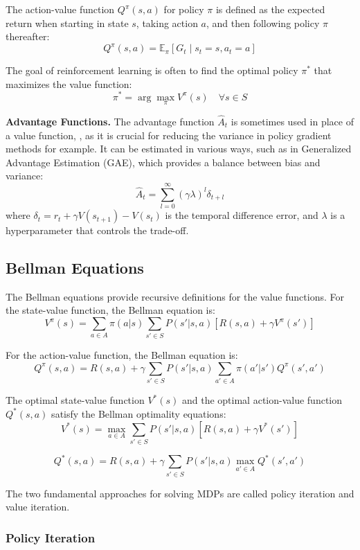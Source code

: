 The action-value function $Q^{\pi}(s, a)$ for policy $\pi$ is defined as the expected return when starting in state $s$, taking action $a$, and then following policy $\pi$ thereafter:
\[
Q^{\pi}(s, a) = \mathbb{E}_{\pi} \left[ G_t \mid s_t = s, a_t = a \right]
\]

The goal of reinforcement learning is often to find the optimal policy $\pi^*$ that maximizes the value function:
\[
\pi^* = \arg\max_{\pi} V^{\pi}(s) \quad \forall s \in S
\]

\textbf{Advantage Functions.} The advantage function $\hat{A}_t$ is sometimes used in place of a value function, , as it is crucial for reducing the variance in policy gradient methods for example.
It can be estimated in various ways, such as in Generalized Advantage Estimation (GAE), which provides a balance between bias and variance:
\[
\hat{A}_t = \sum_{l=0}^{\infty} (\gamma \lambda)^l \delta_{t+l}
\]
where $\delta_t = r_t + \gamma V(s_{t+1}) - V(s_t)$ is the temporal difference error, and $\lambda$ is a hyperparameter that controls the trade-off.

\subsection{Bellman Equations}

The Bellman equations provide recursive definitions for the value functions. For the state-value function, the Bellman equation is:
\[
V^{\pi}(s) = \sum_{a \in A} \pi(a|s) \sum_{s' \in S} P(s'|s,a) \left[ R(s,a) + \gamma V^{\pi}(s') \right]
\]

For the action-value function, the Bellman equation is:
\[
Q^{\pi}(s, a) = R(s,a) + \gamma \sum_{s' \in S} P(s'|s,a) \sum_{a' \in A} \pi(a'|s') Q^{\pi}(s', a')
\]

The optimal state-value function $V^*(s)$ and the optimal action-value function $Q^*(s, a)$ satisfy the Bellman optimality equations:
\[
V^*(s) = \max_{a \in A} \sum_{s' \in S} P(s'|s,a) \left[ R(s,a) + \gamma V^*(s') \right]
\]

\[
Q^*(s, a) = R(s,a) + \gamma \sum_{s' \in S} P(s'|s,a) \max_{a' \in A} Q^*(s', a')
\]

The two fundamental approaches for solving MDPs are called policy iteration and value iteration.

\subsubsection{Policy Iteration}

